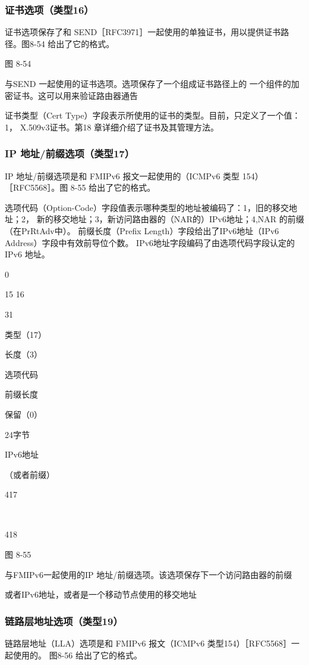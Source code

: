 \subsubsection{证书选项（类型16）}
证书选项保存了和 SEND［RFC3971］一起使用的单独证书，用以提供证书路径。图8-54
给出了它的格式。

图 8-54

与SEND 一起使用的证书选项。选项保存了一个组成证书路径上的
一个组件的加密证书。这可以用来验证路由器通告

证书类型（Cert Type）字段表示所使用的证书的类型。目前，只定义了一个值：1，
X.509v3证书。第18 章详细介绍了证书及其管理方法。

\subsubsection{IP 地址/前缀选项（类型17）}
IP 地址/前缀选项是和 FMIPv6 报文一起使用的（ICMPv6 类型 154）［RFC5568］。图
8-55 给出了它的格式。

选项代码（Option-Code）字段值表示哪种类型的地址被编码了：1，旧的移交地址；2，
新的移交地址；3，新访问路由器的（NAR的）IPv6地址；4,NAR 的前缀（在PrRtAdv中）。
前缀长度（Prefix Length）字段给出了IPv6地址（IPv6 Address）字段中有效前导位个数。
IPv6地址字段编码了由选项代码字段认定的 IPv6 地址。

0

15 16

31

类型（17）

长度（3）

选项代码

前缀长度

保留（0）

24字节

IPv6地址

（或者前缀）

417

~

418

图 8-55

与FMIPv6一起使用的IP 地址/前缀选项。该选项保存下一个访问路由器的前缀

或者IPv6地址，或者是一个移动节点使用的移交地址

\subsubsection{链路层地址选项（类型19）}
链路层地址（LLA）选项是和 FMIPv6 报文（ICMPv6 类型154）［RFC5568］一起使用的。
图8-56 给出了它的格式。

